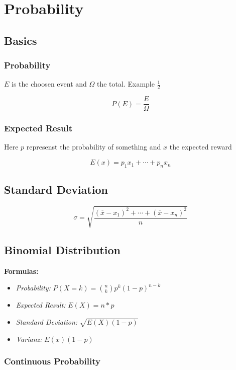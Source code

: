 \section{Probability}

\subsection{Basics}

\subsubsection{Probability}

\(E\) is the choosen event and \(\Omega\) the total. Example \(\frac{1}{2}\)

\[P(E) = \frac{E}{\Omega}\]

\subsubsection{Expected Result}

Here \(p\) represenst the probability of 
something and \(x\) the expected reward

\[E(x) = p_1 x_1 + \cdots + p_n x_n\]

\subsection{Standard Deviation}

\[
\sigma = \sqrt{ \frac{ (\overline{x} - x_1)^2 + \cdots + (\overline{x} - x_n)^2 }{ n } }
\]


\subsection{Binomial Distribution}

\textbf{Formulas:}

\begin{itemize}[label=\(-\)]
    \item \emph{Probability: } \(P(X = k) = \binom{n}{k} p^k (1 - p)^{n - k}\)
    \item \emph{Expected Result: } \(E(X) = n * p\)
    \item \emph{Standard Deviation: } \(\sqrt{E(X)(1-p)}\)
    \item  \emph{Varianz: } \(E(x)(1-p)\)
\end{itemize}

\subsubsection{Continuous Probability}

